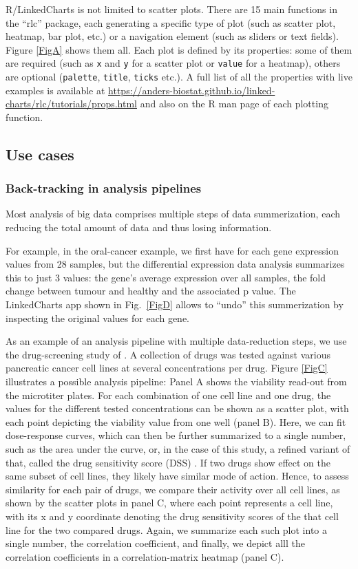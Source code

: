 \documentclass[twocolumn,10pt]{article}
\begin{document}
R/LinkedCharts is not limited to scatter plots. There are 15 main functions in the ``rlc'' package, each generating a specific type of plot (such as scatter plot, heatmap, bar plot, etc.) or a navigation element (such as sliders or text fields). Figure \ref{FigA} shows them all. Each plot is defined by its properties: some of them are required (such as \texttt{x} and \texttt{y} for a scatter plot or \texttt{value} for a heatmap), others are optional (\texttt{palette}, \texttt{title}, \texttt{ticks} etc.). A full list of all the properties with live examples is available at \url{https://anders-biostat.github.io/linked-charts/rlc/tutorials/props.html} and also on the R man page of each plotting function.

\subsection{Use cases}
\subsubsection{Back-tracking in analysis pipelines}

Most analysis of big data comprises multiple steps of data summerization, each reducing the total amount of data and thus losing information.

For example, in the oral-cancer example, we first have for each gene expression values from 28 samples, but the differential expression data analysis summarizes this to just 3 values: the gene's average expression over all samples, the fold change between tumour and healthy and the associated p value. The LinkedCharts app shown in Fig.\ \ref{FigD} allows to ``undo'' this summerization by inspecting the original values for each gene.

As an example of an analysis pipeline with multiple data-reduction steps, we use the drug-screening study of \citet{he_2018}. A collection of drugs was tested against various pancreatic cancer cell lines at several concentrations per drug. Figure \ref{FigC} illustrates a possible analysis pipeline: Panel A shows the viability read-out from the microtiter plates. For each combination of one cell line and one drug, the values for the different tested concentrations can be shown as a scatter plot, with each point depicting the viability value from one well (panel B). Here, we can fit dose-response curves, which can then be further summarized to a single number, such as the area under the curve, or, in the case of this study, a refined variant of that, called the drug sensitivity score (DSS) \citep{yadav_2014}. If two drugs show effect on the same subset of cell lines, they likely have similar mode of action. Hence, to assess similarity for each pair of drugs, we compare their activity over all cell lines, as shown by the scatter plots in panel C, where each point represents a cell line, with its x and y coordinate denoting the drug sensitivity scores of the that cell line for the two compared drugs. Again, we summarize each such plot into a single number, the correlation coefficient, and finally, we depict alll the correlation coefficients in a correlation-matrix heatmap (panel C).
\end{document}
